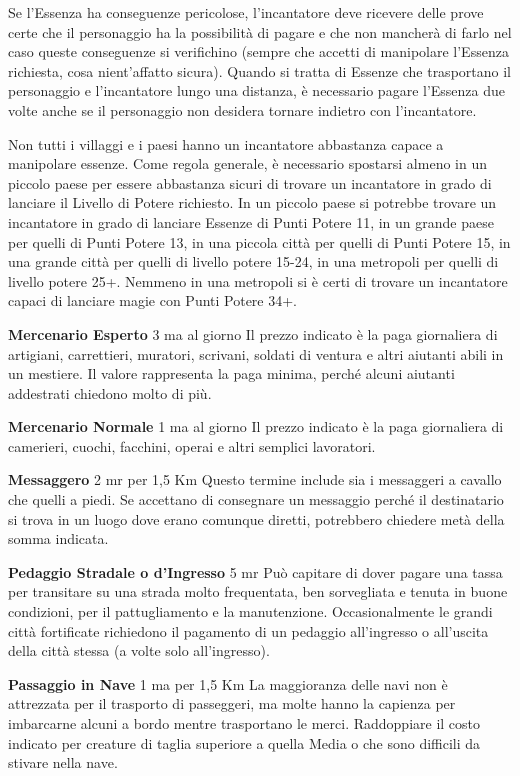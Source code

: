 \documentclass[a4paper,11pt,twoside,openany]{book}
\begin{document}
{Se l'Essenza ha conseguenze pericolose, l'incantatore deve ricevere delle prove certe che il personaggio ha la possibilità di pagare e che non mancherà di farlo nel caso queste conseguenze si verifichino (sempre che accetti di manipolare l'Essenza richiesta, cosa nient'affatto sicura). Quando si tratta di Essenze che trasportano il personaggio e l'incantatore lungo una distanza, è necessario pagare l'Essenza due volte anche se il personaggio non desidera tornare indietro con l'incantatore.

Non tutti i villaggi e i paesi hanno un incantatore abbastanza capace a manipolare essenze. Come regola generale, è necessario spostarsi almeno in un piccolo paese per essere abbastanza sicuri di trovare un incantatore in grado di lanciare il Livello di Potere richiesto. In un piccolo paese si potrebbe trovare un incantatore in grado di lanciare Essenze di Punti Potere 11, in un grande paese per quelli di Punti Potere 13, in una piccola città per quelli di Punti Potere 15, in una grande città per quelli di livello potere 15-24, in una metropoli per quelli di livello potere 25+. Nemmeno in una metropoli si è certi di trovare un incantatore capaci di lanciare magie con Punti Potere 34+. 

\textbf{Mercenario Esperto} 3 ma al giorno Il prezzo indicato è la paga giornaliera di artigiani, carrettieri, muratori, scrivani, soldati di ventura e altri aiutanti abili in un mestiere. Il valore rappresenta la paga minima, perché alcuni aiutanti addestrati chiedono molto di più.

\textbf{Mercenario Normale} 1 ma al giorno Il prezzo indicato è la paga giornaliera di camerieri, cuochi, facchini, operai e altri semplici lavoratori.

\textbf{Messaggero} 2 mr per 1,5 Km Questo termine include sia i messaggeri a cavallo che quelli a piedi. Se accettano di consegnare un messaggio perché il destinatario si trova in un luogo dove erano comunque diretti, potrebbero chiedere metà della somma indicata.

\textbf{Pedaggio Stradale o d'Ingresso} 5 mr Può capitare di dover pagare una tassa per transitare su una strada molto frequentata, ben sorvegliata e tenuta in buone condizioni, per il pattugliamento e la manutenzione. Occasionalmente le grandi città fortificate richiedono il pagamento di un pedaggio all'ingresso o all'uscita della città stessa (a volte solo all'ingresso).

\textbf{Passaggio in Nave} 1 ma per 1,5 Km La maggioranza delle navi non è attrezzata per il trasporto di passeggeri, ma molte hanno la capienza per imbarcarne alcuni a bordo mentre trasportano le merci. Raddoppiare il costo indicato per creature di taglia superiore a quella Media o che sono difficili da stivare nella nave.

}
\end{document}
